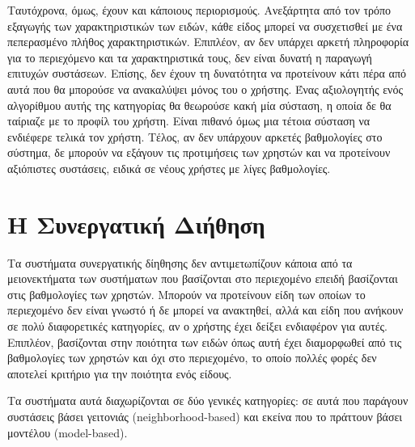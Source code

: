 Ταυτόχρονα, όμως, έχουν και κάποιους περιορισμούς. Ανεξάρτητα από τον τρόπο εξαγωγής των χαρακτηριστικών των ειδών, κάθε είδος μπορεί να συσχετισθεί με ένα πεπερασμένο πλήθος χαρακτηριστικών. Επιπλέον, αν δεν υπάρχει αρκετή πληροφορία για το περιεχόμενο και τα χαρακτηριστικά τους, δεν είναι δυνατή η παραγωγή επιτυχών συστάσεων. Επίσης, δεν έχουν τη δυνατότητα να προτείνουν κάτι πέρα από αυτά που θα μπορούσε να ανακαλύψει μόνος του ο χρήστης. Ένας αξιολογητής ενός αλγορίθμου αυτής της κατηγορίας θα θεωρούσε κακή μία σύσταση, η οποία δε θα ταίριαζε με το προφίλ του χρήστη. Είναι πιθανό όμως μια τέτοια σύσταση να ενδιέφερε τελικά τον χρήστη. Τέλος, αν δεν υπάρχουν αρκετές βαθμολογίες στο σύστημα, δε μπορούν να εξάγουν τις προτιμήσεις των χρηστών και να προτείνουν αξιόπιστες συστάσεις, ειδικά σε νέους χρήστες με λίγες βαθμολογίες. 
\section{Η Συνεργατική Διήθηση}
Τα συστήματα συνεργατικής δίηθησης δεν αντιμετωπίζουν κάποια από τα μειονεκτήματα των συστήματων που βασίζονται στο περιεχομένο επειδή βασίζονται στις βαθμολογίες των χρηστών. Μπορούν να προτείνουν είδη των οποίων το περιεχομένο δεν είναι γνωστό ή δε μπορεί να ανακτηθεί, αλλά και είδη που ανήκουν σε πολύ διαφορετικές κατηγορίες, αν ο χρήστης έχει δείξει ενδιαφέρον για αυτές. Επιπλέον, βασίζονται στην ποιότητα των ειδών όπως αυτή έχει διαμορφωθεί από τις βαθμολογίες των χρηστών και όχι στο περιεχομένο, το οποίο πολλές φορές δεν αποτελεί κριτήριο για την ποιότητα ενός είδους. \cite{ricci2011recommender}\par  
Τα συστήματα αυτά διαχωρίζονται σε δύο γενικές κατηγορίες: σε αυτά που παράγουν συστάσεις βάσει γειτονιάς ({\en neighborhood-based}) και εκείνα που το πράττουν βάσει μοντέλου ({\en model-based}). 
